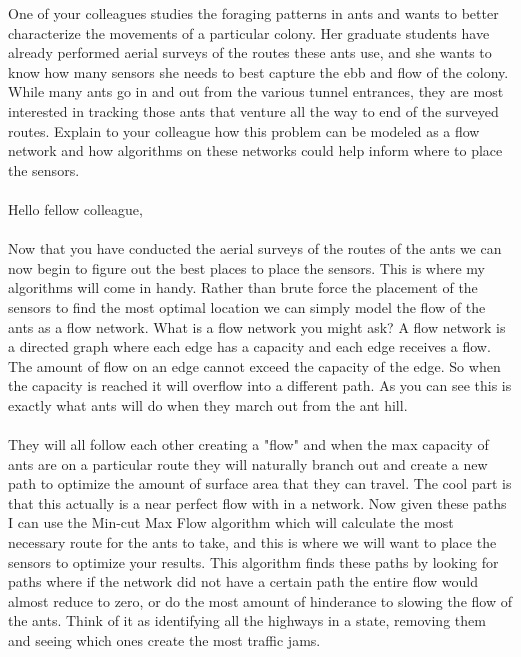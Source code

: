 \documentclass[12pt]{article}
\begin{document}
\renewcommand{\headrulewidth}{0.5pt}

\phantom{Test}
One of your colleagues studies the foraging patterns in ants and wants to
better characterize the movements of a particular colony. Her graduate students
have already performed aerial surveys of the routes these ants use, and she
wants to know how many sensors she needs to best capture the ebb and flow of
the colony. While many ants go in and out from the various tunnel entrances,
they are most interested in tracking those ants that venture all the way to end
of the surveyed routes. Explain to your colleague how this problem can be
modeled as a flow network and how algorithms on these networks could help
inform where to place the sensors.
\\
\\
Hello fellow colleague,
\\
\\
Now that you have conducted the aerial surveys of the routes of the ants we can now begin to figure out the best places to place the sensors. This is where my algorithms will come in handy. Rather than brute force the placement of the sensors to find the most optimal location we can simply model the flow of the ants as a flow network. What is a flow network you might ask? A flow network  is a directed graph where each edge has a capacity and each edge receives a flow. The amount of flow on an edge cannot exceed the capacity of the edge. So when the capacity is reached it will overflow into a different path. As you can see this is exactly what ants will do when they march out from the ant hill.
\\
\\
They will all follow each other creating a "flow" and when the max capacity of ants are on a particular route they will naturally branch out and create a new path to optimize the amount of surface area that they can travel. The cool part is that this actually is a near perfect flow with in a network. Now given these paths I can use the Min-cut Max Flow algorithm which will calculate the most necessary route for the ants to take, and this is where we will want to place the sensors to optimize your results. This algorithm finds these paths by looking for paths where if the network did not have a certain path the entire flow would almost reduce to zero, or do the most amount of hinderance to slowing the flow of the ants. Think of it as identifying all the highways in a state, removing them and seeing which ones create the most traffic jams. 
\end{document}
